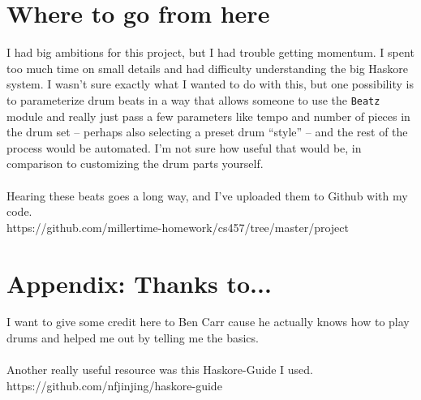 \documentclass{article}
\begin{document}
\section*{Where to go from here}
\indent I had big ambitions for this project, but I had trouble getting momentum. 
I spent too much time on small details and had difficulty understanding the big
Haskore system. I wasn't sure exactly what I wanted to do with this, but one 
possibility is to parameterize drum beats in a way that allows someone to use the 
\lstinline{Beatz} module and really just pass a few parameters like tempo and
number of pieces in the drum set -- perhaps also selecting a preset drum ``style''
-- and the rest of the process would be automated. I'm not sure how useful that
would be, in comparison to customizing the drum parts yourself.\\
\\
\indent Hearing these beats goes a long way, and I've uploaded them to 
Github with my code.\\
https://github.com/millertime-homework/cs457/tree/master/project
\pagebreak

\section*{Appendix: Thanks to...}
I want to give some credit here to Ben Carr cause he actually knows how to 
play drums and helped me out by telling me the basics.\\
\\
Another really useful resource was this Haskore-Guide I used.\\
https://github.com/nfjinjing/haskore-guide
\end{document}
